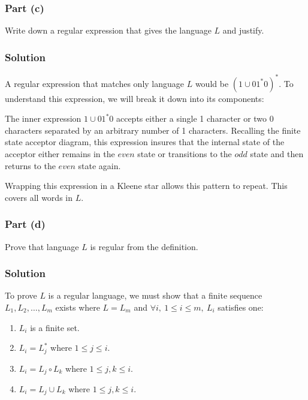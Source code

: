 \documentclass[12pt]{article}
\begin{document}
\pagebreak
\subsubsection*{Part (c)}

Write down a regular expression that gives the language $L$ and justify.

\subsubsection*{Solution}

A regular expression that matches only language $L$ would be ${(1 \cup 01^{*}0)}^{*}$.
To understand this expression, we will break it down into its components:

The inner expression $1 \cup 01^{*}0$ accepts either a single 1 character or two 0 characters separated by an arbitrary number of 1 characters.
Recalling the finite state acceptor diagram, this expression insures that the internal state of the acceptor either remains in the $even$ state or transitions to the $odd$ state and then returns to the $even$ state again.

Wrapping this expression in a Kleene star allows this pattern to repeat. This covers all words in $L$.

\subsubsection*{Part (d)}

Prove that language $L$ is regular from the definition.

\subsubsection*{Solution}

To prove $L$ is a regular language, we must show that a finite sequence $L_{1}, L_{2}, \ldots, L_{m}$ exists where $L = L_m$ and $\forall i,\ 1 \leq i \leq m,\ L_{i}$ satisfies one:
\begin{enumerate}[label = \arabic*.]
	\item $L_{i}$ is a finite set.
	\item $L_{i} = L_{j}^{*}$ where $1 \leq j \leq i$.
	\item $L_{i} = L_{j} \circ L_{k}$ where $1 \leq j,k \leq i$.
	\item $L_{i} = L_{j} \cup L_{k}$ where $1 \leq j,k \leq i$.
\end{enumerate}
\end{document}

